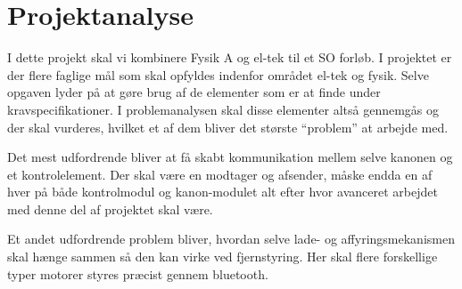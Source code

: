 \section{Projektanalyse}

I dette projekt skal vi kombinere Fysik A og el-tek til et SO forløb. I projektet er der flere faglige mål som skal opfyldes indenfor området el-tek og fysik. Selve opgaven lyder på at gøre brug af de elementer som er at finde under kravspecifikationer. I problemanalysen skal disse elementer altså gennemgås og der skal vurderes, hvilket et af dem bliver det største “problem” at arbejde med. 

Det mest udfordrende bliver at få skabt kommunikation mellem selve kanonen og et kontrolelement. Der skal være en modtager og afsender, måske endda en af hver på både kontrolmodul og kanon-modulet alt efter hvor avanceret arbejdet med denne del af projektet skal være. 

Et andet udfordrende problem bliver, hvordan selve lade- og affyringsmekanismen skal hænge sammen så den kan virke ved fjernstyring. Her skal flere forskellige typer motorer styres præcist gennem bluetooth.
